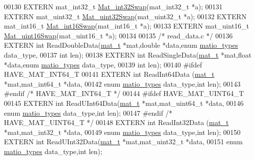 \begin{DoxyCode}
00130 EXTERN mat\_int32\_t   \hyperlink{endian_8c_a2e0153996243f0a34df9a5286087cfa3}{Mat\_int32Swap}(mat\_int32\_t  *a);
00131 EXTERN mat\_uint32\_t  \hyperlink{endian_8c_a8cb0d0750e2eaf9840d95db531934f4f}{Mat\_uint32Swap}(mat\_uint32\_t *a);
00132 EXTERN mat\_int16\_t   \hyperlink{endian_8c_a741eb8019dbc3e8addfc0e75adb0dd90}{Mat\_int16Swap}(mat\_int16\_t  *a);
00133 EXTERN mat\_uint16\_t  \hyperlink{endian_8c_a0fd527794c69f2872e80a6f20cd09fd2}{Mat\_uint16Swap}(mat\_uint16\_t *a);
00134 
00135 \textcolor{comment}{/* read\_data.c */}
00136 EXTERN \textcolor{keywordtype}{int} ReadDoubleData(\hyperlink{struct__mat__t}{mat\_t} *mat,\textcolor{keywordtype}{double}  *data,\textcolor{keyword}{enum} \hyperlink{group___m_a_t_gacf7b3b879282b7ab3a51190e49bf3453}{matio\_types} data\_type,
00137                \textcolor{keywordtype}{int} len);
00138 EXTERN \textcolor{keywordtype}{int} ReadSingleData(\hyperlink{struct__mat__t}{mat\_t} *mat,\textcolor{keywordtype}{float}   *data,\textcolor{keyword}{enum} \hyperlink{group___m_a_t_gacf7b3b879282b7ab3a51190e49bf3453}{matio\_types} data\_type,
00139                \textcolor{keywordtype}{int} len);
00140 \textcolor{preprocessor}{#ifdef HAVE\_MAT\_INT64\_T}
00141 EXTERN \textcolor{keywordtype}{int} ReadInt64Data (\hyperlink{struct__mat__t}{mat\_t} *mat,mat\_int64\_t *data,
00142                \textcolor{keyword}{enum} \hyperlink{group___m_a_t_gacf7b3b879282b7ab3a51190e49bf3453}{matio\_types} data\_type,\textcolor{keywordtype}{int} len);
00143 \textcolor{preprocessor}{#endif }\textcolor{comment}{/* HAVE\_MAT\_INT64\_T */}\textcolor{preprocessor}{}
00144 \textcolor{preprocessor}{#ifdef HAVE\_MAT\_UINT64\_T}
00145 EXTERN \textcolor{keywordtype}{int} ReadUInt64Data(\hyperlink{struct__mat__t}{mat\_t} *mat,mat\_uint64\_t *data,
00146                \textcolor{keyword}{enum} \hyperlink{group___m_a_t_gacf7b3b879282b7ab3a51190e49bf3453}{matio\_types} data\_type,\textcolor{keywordtype}{int} len);
00147 \textcolor{preprocessor}{#endif }\textcolor{comment}{/* HAVE\_MAT\_UINT64\_T */}\textcolor{preprocessor}{}
00148 EXTERN \textcolor{keywordtype}{int} ReadInt32Data (\hyperlink{struct__mat__t}{mat\_t} *mat,mat\_int32\_t *data,
00149                \textcolor{keyword}{enum} \hyperlink{group___m_a_t_gacf7b3b879282b7ab3a51190e49bf3453}{matio\_types} data\_type,\textcolor{keywordtype}{int} len);
00150 EXTERN \textcolor{keywordtype}{int} ReadUInt32Data(\hyperlink{struct__mat__t}{mat\_t} *mat,mat\_uint32\_t *data,
00151                \textcolor{keyword}{enum} \hyperlink{group___m_a_t_gacf7b3b879282b7ab3a51190e49bf3453}{matio\_types} data\_type,\textcolor{keywordtype}{int} len);

\end{DoxyCode}
